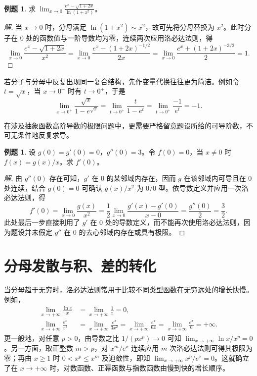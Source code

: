 \documentclass[UTF8,fontset=fandol,a4paper,12pt]{ctexart}
\theoremstyle{definition}
\newtheorem{example}[theorem]{例题}
\begin{document}
\begin{example}
求 $\displaystyle\lim_{x\to0}\frac{e^x-\sqrt{1+2x}}{\ln(1+x^2)}$。
\end{example}

\begin{proof}[解]
当 $x\to0$ 时，分母满足 $\ln(1+x^2)\sim x^2$，故可先将分母替换为 $x^2$。此时分子在 $0$ 处的函数值与一阶导数均为零，连续两次应用洛必达法则，得
\[
 \lim_{x\to0}\frac{e^x-\sqrt{1+2x}}{x^2}
 =\lim_{x\to0}\frac{e^x-(1+2x)^{-1/2}}{2x}
 =\lim_{x\to0}\frac{e^x+(1+2x)^{-3/2}}2=1.
\]
\end{proof}

若分子与分母中反复出现同一复合结构，先作变量代换往往更为简洁。例如令 $t=\sqrt{x}$，当 $x\to0^+$ 时有 $t\to0^+$，于是
\[
 \lim_{x\to0^+}\frac{\sqrt{x}}{1-e^{\sqrt{x}}}
 =\lim_{t\to0^+}\frac{t}{1-e^t}
 =\lim_{t\to0^+}\frac{-1}{e^t}=-1.
\]

在涉及抽象函数高阶导数的极限问题中，更需要严格留意题设所给的可导阶数，不可无条件地反复求导。

\begin{example}
设 $g(0)=g'(0)=0$，$g''(0)=3$。令 $f(0)=0$，当 $x\ne0$ 时 $f(x)=g(x)/x$。求 $f'(0)$。
\end{example}

\begin{proof}[解]
由 $g''(0)$ 存在可知，$g'$ 在 $0$ 的某邻域内存在，因而 $g$ 在该邻域内可导且在 $0$ 处连续，结合 $g(0)=0$ 可确认 $g(x)/x^2$ 为 $0/0$ 型。依导数定义并应用一次洛必达法则，得
\[
 f'(0)=\lim_{x\to0}\frac{g(x)}{x^2}
 =\frac12\lim_{x\to0}\frac{g'(x)-g'(0)}{x-0}
 =\frac{g''(0)}2=\frac32.
\]
此处最后一步直接利用了 $g'$ 在 $0$ 处的导数定义，而不能再次使用洛必达法则，因为题设并未假定 $g''$ 在 $0$ 的去心邻域内存在或具有极限。
\end{proof}

\section{分母发散与积、差的转化}
当分母趋于无穷时，洛必达法则常用于比较不同类型函数在无穷远处的增长快慢。例如，
\begin{align*}
 \lim_{x\to+\infty}\frac{\ln x}{x}&=\lim_{x\to+\infty}\frac1x=0,\\
 \lim_{x\to+\infty}\frac{e^x}{x^3}
 &=\lim_{x\to+\infty}\frac{e^x}{3x^2}
 =\lim_{x\to+\infty}\frac{e^x}{6x}
 =\lim_{x\to+\infty}\frac{e^x}{6}=+\infty.
\end{align*}
更一般地，对任意 $p>0$，由导数之比 $1/(p x^p)\to0$ 可知 $\lim_{x\to+\infty}\ln x/x^p=0$。另一方面，取正整数 $m>p$，对 $x^m/e^x$ 连续应用 $m$ 次洛必达法则可得其极限为零；再由 $x\ge1$ 时 $0<x^p\le x^m$ 及迫敛性，即知 $\lim_{x\to+\infty}x^p/e^x=0$。这就确立了在 $x\to+\infty$ 时，对数函数、正幂函数与指数函数由慢到快的增长顺序。
\end{document}
